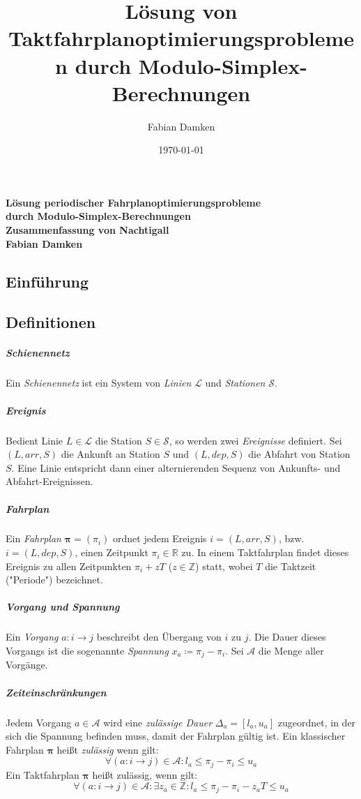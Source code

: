 \documentclass[a4paper, 10pt, twocolumn]{scrartcl}
\title{Lösung von Taktfahrplanoptimierungsproblemen durch Modulo-Simplex-Berechnungen}
\author{Fabian Damken}
\date{\today}
\newcommand{\arr}{\mathit{arr}}
\newcommand{\dep}{\mathit{dep}}
\newcommand{\R}{\ensuremath{\mathbb{R}}}
\newcommand{\Z}{\ensuremath{\mathbb{Z}}}
\renewcommand{\vec}[1]{\boldsymbol{#1}}
\newcommand{\bzw}{bzw.~}
\begin{document}
	

	\makeatletter
	\begin{center}
		\textbf{\Large Lösung periodischer \mbox{Fahrplanoptimierungsprobleme} \\ \vspace{2mm} durch Modulo-Simplex-Berechnungen} \\ \vspace{2mm}
		\textbf{\large Zusammenfassung von Nachtigall} \\ \vspace{3mm}
		\textbf{\large Fabian Damken} \\ \vspace{1mm}
		{\large \@date}
	\end{center}
	\makeatother
	
	\subsection*{Einführung}

	\subsection*{Definitionen}
		\subparagraph{Schienennetz}
		Ein \emph{Schienennetz} ist ein System von \emph{Linien} \(\mathcal{L}\) und \emph{Stationen} \(\mathcal{S}\).
	
		\subparagraph{Ereignis}
		Bedient Linie \( L \in \mathcal{L} \) die Station \( S \in \mathcal{S} \), so werden zwei \emph{Ereignisse} definiert. Sei \( (L, \arr, S) \) die Ankunft an Station \(S\) und \( (L, \dep, S) \) die Abfahrt von Station \(S\). Eine Linie entspricht dann einer alternierenden Sequenz von Ankunfts- und Abfahrt-Ereignissen.
	
		\subparagraph{Fahrplan}
		Ein \emph{Fahrplan} \( \vec{\pi} = (\pi_i) \) ordnet jedem Ereignis \( i = (L, \arr, S) \), \bzw \( i = (L, \dep, S) \), einen Zeitpunkt \( \pi_i \in \R \) zu. In einem Taktfahrplan findet dieses Ereignis zu allen Zeitpunkten \( \pi_i + z T \) (\( z \in \Z \)) statt, wobei \( T \) die Taktzeit ("Periode") bezeichnet.
		
		\subparagraph{Vorgang und Spannung}
		Ein \emph{Vorgang} \( a : i \to j \) beschreibt den Übergang von \(i\) zu \(j\). Die Dauer dieses Vorgangs ist die sogenannte \emph{Spannung} \( x_a \coloneqq \pi_j - \pi_i \). Sei \(\mathcal{A}\) die Menge aller Vorgänge.
		
		\subparagraph{Zeiteinschränkungen}
		Jedem Vorgang \( a \in \mathcal{A} \) wird eine \emph{zulässige Dauer} \( \Delta_a = [l_a, u_a] \) zugeordnet, in der sich die Spannung befinden muss, damit der Fahrplan gültig ist. Ein klassischer Fahrplan \(\vec{\pi}\) heißt \emph{zulässig} wenn gilt:
		\begin{equation*}
			\forall (a : i \to j) \in \mathcal{A} : l_a \leq \pi_j - \pi_i \leq u_a
		\end{equation*}
		Ein Taktfahrplan \( \vec{\pi} \) heißt zulässig, wenn gilt:
		\begin{equation*}
			\forall (a : i \to j) \in \mathcal{A} : \exists z_a \in \Z : l_a \leq \pi_j - \pi_i - z_a T \leq u_a
		\end{equation*}
		
\end{document}
